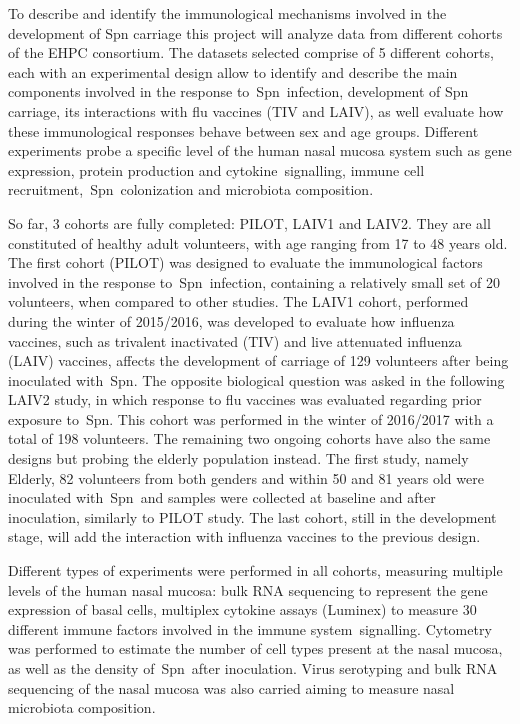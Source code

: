 \documentclass[
]{book}
\begin{document}
To describe and identify the immunological mechanisms involved in the development of Spn carriage this project will analyze data from different cohorts of the EHPC consortium. The datasets selected comprise of 5 different cohorts, each with an experimental design allow to identify and describe the main components involved in the response to~Spn~infection, development of Spn carriage, its interactions with flu vaccines (TIV and LAIV), as well evaluate how these immunological responses behave between sex and age groups. Different experiments probe a specific level of the human nasal mucosa system such as gene expression, protein production and cytokine~signalling, immune cell recruitment,~Spn~colonization and microbiota composition.

So far, 3 cohorts are fully completed: PILOT, LAIV1 and LAIV2. They are all constituted of healthy adult volunteers, with age ranging from 17 to 48 years old. The first cohort (PILOT) was designed to evaluate the immunological factors involved in the response to~Spn~infection, containing a relatively small set of 20 volunteers, when compared to other studies. The LAIV1 cohort, performed during the winter of 2015/2016, was developed to evaluate how influenza vaccines, such as trivalent inactivated (TIV) and live attenuated influenza (LAIV) vaccines, affects the development of carriage of 129 volunteers after being inoculated with~Spn. The opposite biological question was asked in the following LAIV2 study, in which response to flu vaccines was evaluated regarding prior exposure to~Spn. This cohort was performed in the winter of 2016/2017 with a total of 198 volunteers. The remaining two ongoing cohorts have also the same designs but probing the elderly population instead. The first study, namely Elderly, 82 volunteers from both genders and within 50 and 81 years old were inoculated with~Spn~and samples were collected at baseline and after inoculation, similarly to PILOT study. The last cohort, still in the development stage, will add the interaction with influenza vaccines to the previous design.

Different types of experiments were performed in all cohorts, measuring multiple levels of the human nasal mucosa: bulk RNA sequencing to represent the gene expression of basal cells, multiplex cytokine assays (Luminex) to measure 30 different immune factors involved in the immune system~signalling. Cytometry was performed to estimate the number of cell types present at the nasal mucosa, as well as the density of~Spn~after inoculation. Virus serotyping and bulk RNA sequencing of the nasal mucosa was also carried aiming to measure nasal microbiota composition.
\end{document}
